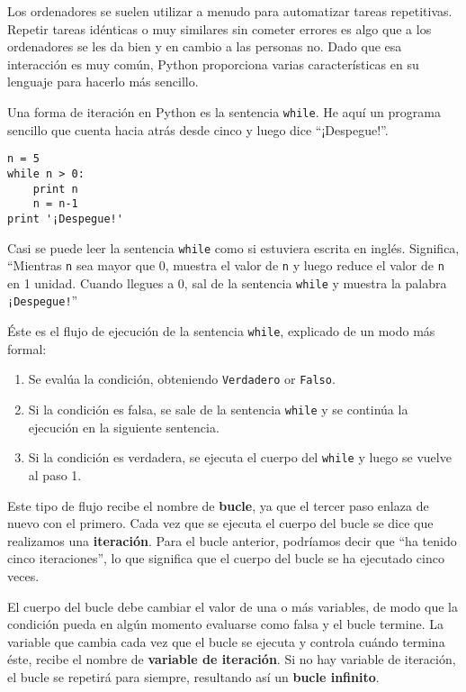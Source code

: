 Los ordenadores se suelen utilizar a menudo para automatizar tareas repetitivas. Repetir
tareas idénticas o muy similares sin cometer errores es algo que a los
ordenadores se les da bien y en cambio a las personas no.
Dado que esa interacción es muy común, Python proporciona varias
características en su lenguaje para hacerlo más sencillo.

Una forma de iteración en Python es la sentencia {\tt while}. He aquí un
programa sencillo que cuenta hacia atrás desde cinco y luego dice ``¡Despegue!''.

\beforeverb
\begin{verbatim}
n = 5
while n > 0:
    print n
    n = n-1
print '¡Despegue!'
\end{verbatim}
\afterverb
%
Casi se puede leer la sentencia {\tt while} como si estuviera escrita en inglés.
Significa, ``Mientras {\tt n} sea mayor que 0,
muestra el valor de {\tt n} y luego reduce el valor de {\tt n}
en 1 unidad. Cuando llegues a 0, sal de la sentencia {\tt while} y
muestra la palabra {\tt ¡Despegue!}''


Éste es el flujo de ejecución de la sentencia {\tt while}, explicado de un modo más formal:

\begin{enumerate}

\item Se evalúa la condición, obteniendo {\tt Verdadero} or {\tt Falso}.

\item Si la condición es falsa, se sale de la sentencia {\tt while}
y se continúa la ejecución en la siguiente sentencia.

\item Si la condición es verdadera, se ejecuta el
cuerpo del {\tt while} y luego se vuelve al paso 1.

\end{enumerate}

Este tipo de flujo recibe el nombre de {\bf bucle}, ya que el tercer paso
enlaza de nuevo con el primero. Cada vez que se ejecuta el cuerpo del
bucle se dice que realizamos una {\bf iteración}. Para el bucle anterior,
podríamos decir que ``ha tenido cinco iteraciones'', lo que significa que el cuerpo
del bucle se ha ejecutado cinco veces.


El cuerpo del bucle debe cambiar el valor de una o más variables,
de modo que la condición pueda en algún momento evaluarse como falsa
y el bucle termine.
La variable que cambia cada vez que el bucle se ejecuta
y controla cuándo termina éste, recibe el nombre de
{\bf variable de iteración}.
Si no hay variable de iteración, el bucle se repetirá para siempre,
resultando así un {\bf bucle infinito}.

